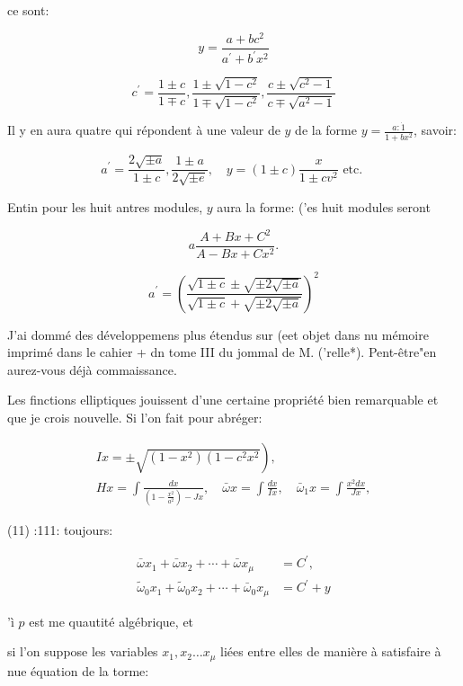 \documentclass{article}
\begin{document}
ce sont:

\[
y=\frac{a+b c^{2}}{a^{\prime}+b^{\prime} x^{2}}
\]

\[
c^{\prime}=\frac{1 \pm c}{1 \mp c}, \frac{1 \pm \sqrt{1-c^{2}}}{1 \mp \sqrt{1-c^{2}}}, \frac{c \pm \sqrt{c^{2}-1}}{c \mp \sqrt{a^{2}-1}}
\]

Il y en aura quatre qui répondent à une valeur de \(y\) de la forme \(y=\frac{a: \dot{1}}{1+b x^{2}}\), savoir:

\[
a^{\prime}=\frac{2 \sqrt{ \pm a}}{1 \pm c}, \frac{1 \pm a}{2 \sqrt{ \pm e}}, \quad y=(1 \pm c) \frac{x}{1 \pm c v^{2}} \text { etc. }
\]

Entin pour les huit antres modules, \(y\) aura la forme:
('es huit modules seront

\[
a \frac{A+B x+C^{2}}{A-B x+C x^{2}} .
\]

\[
a^{\prime}=\left(\frac{\sqrt{1 \pm c} \pm \sqrt{ \pm 2 \sqrt{ \pm a}}}{\sqrt{1 \pm c}+\sqrt{ \pm 2 \sqrt{ \pm a}}}\right)^{2}
\]

J'ai dommé des développemens plus étendus sur (eet objet dans nu mémoire imprimé dans le cahier + dn tome III du jommal de M. ('relle*). Pent-être"en aurez-vous déjà commaissance.

Les finctions elliptiques jouissent d'une certaine propriété bien remarquable et que je crois nouvelle. Si l'on fait pour abréger:

\[
\begin{gathered}
\left.I x= \pm \sqrt{\left(1-x^{2}\right)\left(1-c^{2} x^{2}\right.}\right), \\
H x=\int \frac{d x}{\left(1-\frac{x^{2}}{a^{2}}\right)-J x}, \quad \bar{\omega} x=\int \frac{d x}{I x}, \quad \bar{\omega}_{1} x=\int \frac{x^{2} d x}{J x},
\end{gathered}
\]

(11) :111: toujours:

\[
\begin{aligned}
\bar{\omega} x_{1}+\bar{\omega} x_{2}+\cdots+\bar{\omega} x_{\mu} & =C^{\prime}, \\
\widetilde{\omega}_{0} x_{1}+\widetilde{\omega}_{0} x_{2}+\cdots+\bar{\omega}_{0} x_{\mu} & =C^{\prime}+y
\end{aligned}
\]

'ì \(p\) est me quautité algébrique, et


si l'on suppose les variables \(x_{1}, x_{2} \ldots x_{\mu}\) liées entre elles de manière à satisfaire à nue équation de la torme:
\end{document}
